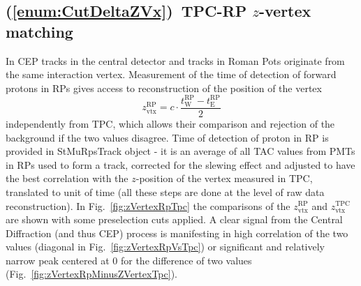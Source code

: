 \subsection{(\ref{enum:CutDeltaZVx})~TPC-RP \texorpdfstring{$z$}{z}-vertex matching}

In CEP tracks in the central detector and tracks in Roman Pots originate from the same interaction vertex. Measurement of the time of detection of forward protons in RPs gives access to reconstruction of the position of the vertex
\begin{equation}
z_{\text{vtx}}^{\text{RP}} = c\cdot\frac{t^{\text{RP}}_{\text{W}} - t^{\text{RP}}_{\text{E}}}{2}
\end{equation}
independently from TPC, which allows their comparison and rejection of the background if the two values disagree. Time of detection of proton in RP is provided in StMuRpsTrack object - it is an average of all TAC values from PMTs in RPs used to form a track, corrected for the slewing effect and adjusted to have the best correlation with the $z$-position of the vertex measured in TPC, translated to unit of time (all these steps are done at the level of raw data reconstruction). In Fig.~\ref{fig:zVertexRpTpc} the comparisons of the $z_{\text{vtx}}^{\text{RP}}$ and $z_{\text{vtx}}^{\text{TPC}}$ are shown with some preselection cuts applied. A clear signal from the Central Diffraction (and thus CEP) process is manifesting in high correlation of the two values (diagonal in Fig.~\ref{fig:zVertexRpVsTpc}) or significant and relatively narrow peak centered at 0 for the difference of two values (Fig.~\ref{fig:zVertexRpMinusZVertexTpc}). %
